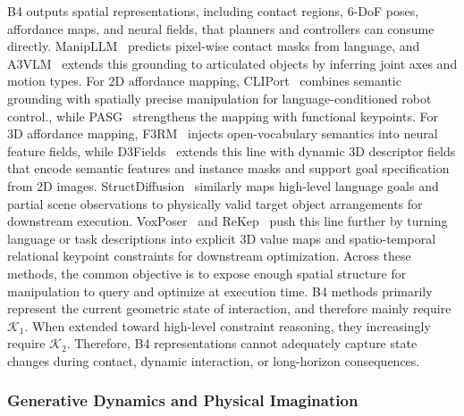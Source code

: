 \documentclass[acmsmall,screen,review]{acmart}
\begin{document}
B4 outputs spatial representations, including contact regions, 6-DoF poses, affordance maps, and neural fields, that planners and controllers can consume directly. 
ManipLLM~\cite{li2024manipllm} predicts pixel-wise contact masks from language, 
and A3VLM~\cite{huang2024a3vlm} extends this grounding to articulated objects by inferring joint axes and motion types. 
For 2D affordance mapping, CLIPort~\cite{shridhar2022cliport} combines semantic grounding with spatially precise manipulation for language-conditioned robot control., 
while PASG~\cite{zhu2025pasg} strengthens the mapping with functional keypoints. 
For 3D affordance mapping, F3RM~\cite{shen2023distilled} injects open-vocabulary semantics into neural feature fields, 
while D3Fields~\cite{wang2025d3fields} extends this line with dynamic 3D descriptor fields that encode semantic features and instance masks and support goal specification from 2D images. 
StructDiffusion~\cite{liu2022structdiffusion} similarly maps high-level language goals and partial scene observations to physically valid target object arrangements for downstream execution.
VoxPoser~\cite{huang2023voxposer} and ReKep~\cite{huang2024rekep} push this line further by turning language or task descriptions into explicit 3D value maps and spatio-temporal relational keypoint constraints for downstream optimization.
Across these methods, the common objective is to expose enough spatial structure for manipulation to query and optimize at execution time. 
B4 methods primarily represent the current geometric state of interaction, and therefore mainly require \(\mathcal{K}_1\). 
When extended toward high-level constraint reasoning, they increasingly require \(\mathcal{K}_2\).
Therefore, B4 representations cannot adequately capture state changes during contact, dynamic interaction, or long-horizon consequences.

\subsubsection{Generative Dynamics and Physical Imagination}\label{sec:generative_dynamics}
\end{document}

